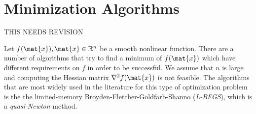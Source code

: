 
%
%
%

\chapter{Minimization Algorithms}\label{chapter:ref:Minimization}
THIS NEEDS REVISION


Let $f(\mat{x}), \mat{x} \in \mathbb{R}^n$ be a smooth nonlinear function.
There are a number of algorithms that try to find a minimum of $f(\mat{x})$
which have different requirements on $f$ in order to be successful.
We assume that $n$ is large and computing the Hessian matrix
$\nabla^2 f(\mat{x})$ is not feasible.
The algorithms that are most widely used in the literature for this type of
optimization problem is the 
the limited-memory Broyden-Fletcher-Goldfarb-Shanno (\emph{L-BFGS}),
which is a \emph{quasi-Newton} method.



% 

